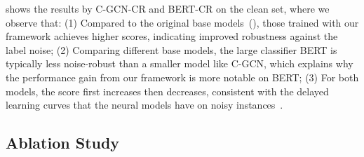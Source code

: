 \documentclass[11pt]{article}
\begin{document}
 shows the results by C-GCN-CR and BERT-CR on the clean set, where we observe that:
(1) Compared to the original base models~(), those trained with our framework achieves higher  scores, indicating improved robustness against the label noise;
(2) Comparing different base models, the large classifier BERT is typically less noise-robust than a smaller model like C-GCN, which explains why the performance gain from our framework is more notable on BERT;
(3) For both models, the  score first increases then decreases, consistent with the delayed learning curves that the neural models have on noisy instances~\cite{Arpit2017ACL}.

\begin{table}[!t]
\centering
{}
    \caption{ score (\%) on the dev and test set of CoNLL03.  marks results obtained using the originally released code.}\label{tab::ner}
\end{table}

\subsection{Ablation Study}\label{sec:ablation}
\end{document}
